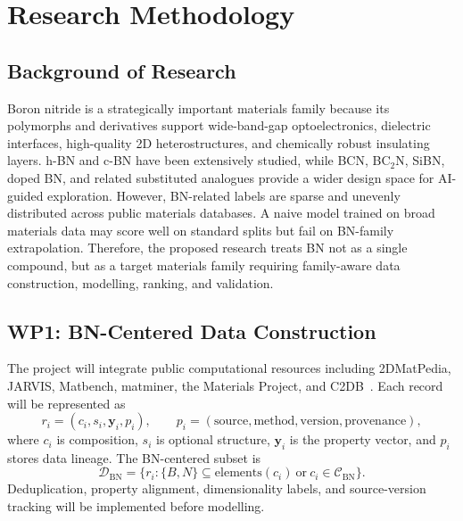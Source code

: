 \documentclass[10pt,a4paper]{article}
\begin{document}
\section{Research Methodology}
\subsection{Background of Research}
Boron nitride is a strategically important materials family because its polymorphs and derivatives support wide-band-gap optoelectronics, dielectric interfaces, high-quality 2D heterostructures, and chemically robust insulating layers. h-BN and c-BN have been extensively studied, while BCN, BC$_2$N, SiBN, doped BN, and related substituted analogues provide a wider design space for AI-guided exploration. However, BN-related labels are sparse and unevenly distributed across public materials databases. A naive model trained on broad materials data may score well on standard splits but fail on BN-family extrapolation. Therefore, the proposed research treats BN not as a single compound, but as a target materials family requiring family-aware data construction, modelling, ranking, and validation.

\subsection{WP1: BN-Centered Data Construction}
The project will integrate public computational resources including 2DMatPedia, JARVIS, Matbench, matminer, the Materials Project, and C2DB~\cite{zhou2019_2dmatpedia,choudhary2020_jarvis,dunn2020_matbench,ward2018_matminer,jain2013_mp,haastrup2018_c2db}. Each record will be represented as
\[
  r_i=(c_i,s_i,\mathbf{y}_i,p_i),\qquad
  p_i=(\mathrm{source},\mathrm{method},\mathrm{version},\mathrm{provenance}),
\]
where $c_i$ is composition, $s_i$ is optional structure, $\mathbf{y}_i$ is the property vector, and $p_i$ stores data lineage. The BN-centered subset is
\[
  \mathcal{D}_{\mathrm{BN}}=\{r_i:\{B,N\}\subseteq\mathrm{elements}(c_i)\ \mathrm{or}\ c_i\in\mathcal{C}_{\mathrm{BN}}\}.
\]
Deduplication, property alignment, dimensionality labels, and source-version tracking will be implemented before modelling.
\end{document}
